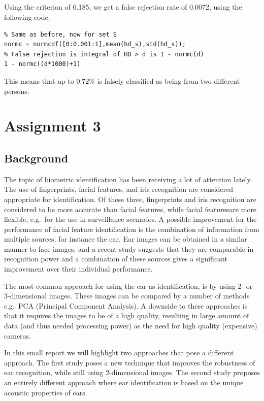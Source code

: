 \documentclass{article}
\begin{document}
\subsection{}
Using the criterion of 0.185, we get a false rejection rate of 0.0072, using the following code:
\begin{lstlisting}
% Same as before, now for set S
normc = normcdf([0:0.001:1],mean(hd_s),std(hd_s));
% False rejection is integral of HD > d is 1 - normc(d)
1 - normc((d*1000)+1)
\end{lstlisting}
This means that up to 0.72\% is falsely classified as being from two different persons.


\newpage
\section{Assignment 3}
\subsection{Background}
The topic of biometric identification has been receiving a lot of attention lately. %
The use of fingerprints, facial features, and iris recognition are considered appropriate for identification.
Of these three, fingerprints and iris recognition are considered to be more accurate than facial features,
while facial featuresare more flexible, e.g.\ for the use in surveillance scenarios.
A possible improvement for the performance of facial feature identification is the combination of information from multiple sources,
for instance the ear.
Ear images can be obtained in a similar manner to face images, 
and a recent study suggests that they are comparable in recognition power\cite{chang2003comparison} 
and a combination of these sources gives a significant improvement over their individual performance.

The most common approach for using the ear as identification, is by using 2- or 3-dimensional images.
These images can be compared by a number of methods e.g.\ PCA (Principal Component Analysis).
A downside to these approaches is that it requires the images to be of a high quality,
resulting in large amount of data (and thus needed processing power) as the need for high quality (expensive)
cameras.

In this small report we will highlight two approaches that pose a different approach.
The first study\cite{bustard2008robust} poses a new technique that improves the robustness of ear recognition,
while still using 2-dimensional images. The second study\cite{akkermans2005acoustic} proposes an entirely different approach 
where ear identification is based on the unique acoustic properties of ears.
\end{document}
